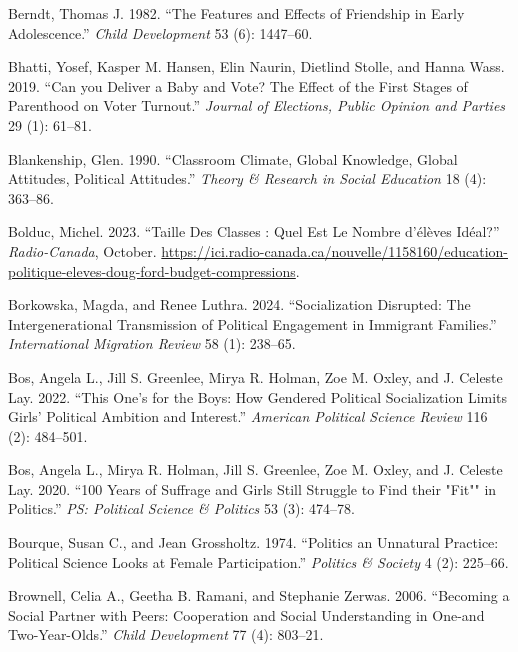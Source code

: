 \documentclass[
  letterpaper,
  DIV=11,
  numbers=noendperiod]{scrreprt}
\newlength{\cslhangindent}
\newenvironment{CSLReferences}[2] %
 {\begin{list}{}{%
  \setlength{\itemindent}{0pt}
  \setlength{\leftmargin}{0pt}
  \setlength{\parsep}{0pt}
  \ifodd #1
   \setlength{\leftmargin}{\cslhangindent}
   \setlength{\itemindent}{-1\cslhangindent}
  \fi
  \setlength{\itemsep}{#2\baselineskip}}}
 {\end{list}}
\begin{document}
\begin{CSLReferences}{1}{0}
Berndt, Thomas J. 1982. {``{The Features and Effects of Friendship in
Early Adolescence}.''} \emph{Child Development} 53 (6): 1447--60.

Bhatti, Yosef, Kasper M. Hansen, Elin Naurin, Dietlind Stolle, and Hanna
Wass. 2019. {``{Can you Deliver a Baby and Vote? The Effect of the First
Stages of Parenthood on Voter Turnout}.''} \emph{Journal of Elections,
Public Opinion and Parties} 29 (1): 61--81.

Blankenship, Glen. 1990. {``{Classroom Climate, Global Knowledge, Global
Attitudes, Political Attitudes}.''} \emph{Theory \& Research in Social
Education} 18 (4): 363--86.

Bolduc, Michel. 2023. {``Taille Des Classes : Quel Est Le Nombre
d'élèves Idéal?''} \emph{Radio-Canada}, October.
\url{https://ici.radio-canada.ca/nouvelle/1158160/education-politique-eleves-doug-ford-budget-compressions}.

Borkowska, Magda, and Renee Luthra. 2024. {``{Socialization Disrupted:
The Intergenerational Transmission of Political Engagement in Immigrant
Families}.''} \emph{{International Migration Review}} 58 (1): 238--65.

Bos, Angela L., Jill S. Greenlee, Mirya R. Holman, Zoe M. Oxley, and J.
Celeste Lay. 2022. {``This One's for the Boys: How Gendered Political
Socialization Limits Girls' Political Ambition and Interest.''}
\emph{American Political Science Review} 116 (2): 484--501.

Bos, Angela L., Mirya R. Holman, Jill S. Greenlee, Zoe M. Oxley, and J.
Celeste Lay. 2020. {``{100 Years of Suffrage and Girls Still Struggle to
Find their "Fit"" in Politics}.''} \emph{PS: Political Science \&
Politics} 53 (3): 474--78.

Bourque, Susan C., and Jean Grossholtz. 1974. {``{Politics an Unnatural
Practice: Political Science Looks at Female Participation}.''}
\emph{Politics \& Society} 4 (2): 225--66.

Brownell, Celia A., Geetha B. Ramani, and Stephanie Zerwas. 2006.
{``{Becoming a Social Partner with Peers: Cooperation and Social
Understanding in One-and Two-Year-Olds}.''} \emph{Child Development} 77
(4): 803--21.


\end{CSLReferences}
\end{document}
